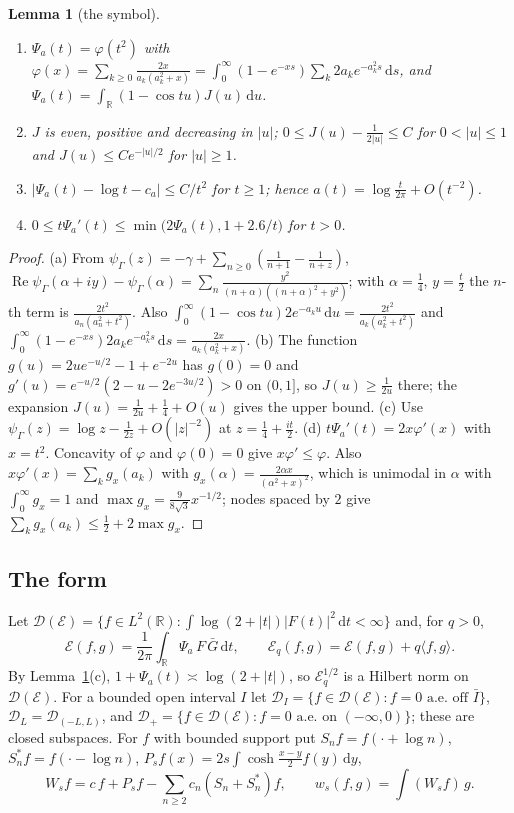 \documentclass[11pt]{amsart}
\newcommand{\R}{\mathbb{R}}
\newcommand{\cE}{\mathcal{E}}
\newcommand{\dd}{\,\mathrm{d}}
\newcommand{\dig}{\psi_\Gamma}
\DeclareMathOperator{\re}{Re}
\newtheorem{lemma}[theorem]{Lemma}
\theoremstyle{definition}
\theoremstyle{remark}
\numberwithin{equation}{section}
\begin{document}
\begin{lemma}[the symbol]\label{lem:symbol}
\begin{enumerate}
\item[(a)] $\Psi_a(t)=\varphi(t^2)$ with $\varphi(x)=\sum_{k\ge0}\frac{2x}{a_k(a_k^2+x)}=\int_0^\infty(1-e^{-xs})\sum_k2a_ke^{-a_k^2s}\dd s$, and $\Psi_a(t)=\int_\R(1-\cos tu)J(u)\dd u$.
\item[(b)] $J$ is even, positive and decreasing in $|u|$; $0\le J(u)-\frac1{2|u|}\le C$ for $0<|u|\le1$ and $J(u)\le Ce^{-|u|/2}$ for $|u|\ge1$.
\item[(c)] $|\Psi_a(t)-\log t-c_a|\le C/t^2$ for $t\ge1$; hence $a(t)=\log\frac t{2\pi}+O(t^{-2})$.
\item[(d)] $0\le t\Psi_a'(t)\le\min\bigl(2\Psi_a(t),1+2.6/t\bigr)$ for $t>0$.
\end{enumerate}
\end{lemma}

\begin{proof}
(a) From $\dig(z)=-\gamma+\sum_{n\ge0}(\frac1{n+1}-\frac1{n+z})$, $\re\dig(\alpha+iy)-\dig(\alpha)=\sum_n\frac{y^2}{(n+\alpha)((n+\alpha)^2+y^2)}$; with $\alpha=\frac14$, $y=\frac t2$ the $n$-th term is $\frac{2t^2}{a_n(a_n^2+t^2)}$. Also $\int_0^\infty(1-\cos tu)2e^{-a_ku}\dd u=\frac{2t^2}{a_k(a_k^2+t^2)}$ and $\int_0^\infty(1-e^{-xs})2a_ke^{-a_k^2s}\dd s=\frac{2x}{a_k(a_k^2+x)}$. (b) The function $g(u)=2ue^{-u/2}-1+e^{-2u}$ has $g(0)=0$ and $g'(u)=e^{-u/2}(2-u-2e^{-3u/2})>0$ on $(0,1]$, so $J(u)\ge\frac1{2u}$ there; the expansion $J(u)=\frac1{2u}+\frac14+O(u)$ gives the upper bound. (c) Use $\dig(z)=\log z-\frac1{2z}+O(|z|^{-2})$ \cite[5.11.2]{DLMF} at $z=\frac14+\frac{it}2$. (d) $t\Psi_a'(t)=2x\varphi'(x)$ with $x=t^2$. Concavity of $\varphi$ and $\varphi(0)=0$ give $x\varphi'\le\varphi$. Also $x\varphi'(x)=\sum_kg_x(a_k)$ with $g_x(\alpha)=\frac{2\alpha x}{(\alpha^2+x)^2}$, which is unimodal in $\alpha$ with $\int_0^\infty g_x=1$ and $\max g_x=\frac9{8\sqrt3}x^{-1/2}$; nodes spaced by $2$ give $\sum_kg_x(a_k)\le\frac12+2\max g_x$.
\end{proof}

\subsection{The form}\label{sec:form}
Let $\mathcal D(\cE)=\{f\in L^2(\R):\int\log(2+|t|)|F(t)|^2\dd t<\infty\}$ and, for $q>0$,
\[
\cE(f,g)=\frac1{2\pi}\int_\R\Psi_a\,F\,\bar G\dd t,\qquad\cE_q(f,g)=\cE(f,g)+q\langle f,g\rangle .
\]
By Lemma~\ref{lem:symbol}(c), $1+\Psi_a(t)\asymp\log(2+|t|)$, so $\cE_q^{1/2}$ is a Hilbert norm on $\mathcal D(\cE)$. For a bounded open interval $I$ let $\mathcal D_I=\{f\in \mathcal D(\cE):f=0\text{ a.e.\ off }\bar I\}$, $\mathcal D_L=\mathcal D_{(-L,L)}$, and $\mathcal D_+=\{f\in \mathcal D(\cE):f=0\text{ a.e.\ on }(-\infty,0)\}$; these are closed subspaces. For $f$ with bounded support put $S_nf=f(\cdot+\log n)$, $S_n^*f=f(\cdot-\log n)$, $P_sf(x)=2s\int\cosh\frac{x-y}2f(y)\dd y$,
\[
W_sf=c\,f+P_sf-\sum_{n\ge2}c_n(S_n+S_n^*)f,\qquad w_s(f,g)=\int(W_sf)\,g .
\]
\end{document}
